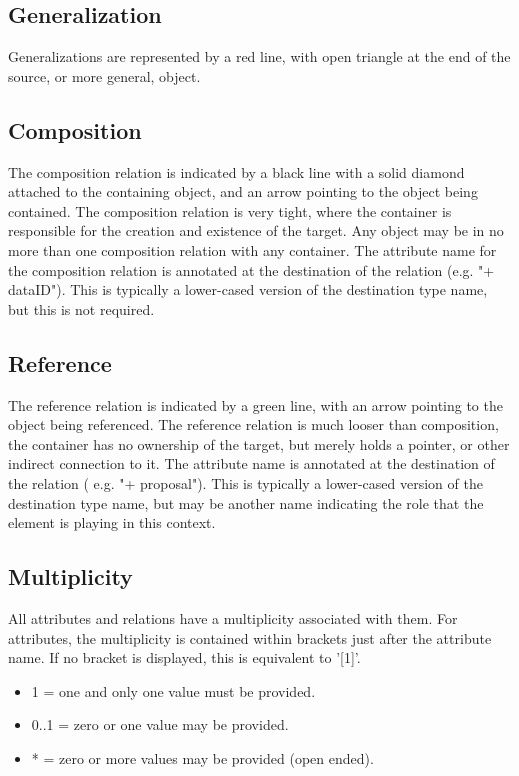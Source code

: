   \subsection{Generalization}
  \label{sect:Generalization}
  Generalizations are represented by a red line, with open triangle at the end of the source, or more general, object.

  \subsection{Composition}
  \label{sect:Composition}
  The composition relation is indicated by a black line with a solid diamond attached to the
containing object, and an arrow pointing to the object being contained. The composition relation is
very tight, where the container is responsible for the creation and existence of the target. Any
object may be in no more than one composition relation with any container. The attribute name
for the composition relation is annotated at the destination of the relation (e.g. "+ dataID"). This is
typically a lower-cased version of the destination type name, but this is not required.

  \subsection{Reference}
  \label{sect:Reference}
  The reference relation is indicated by a green line, with an arrow pointing to the object being
referenced. The reference relation is much looser than composition, the container has no
ownership of the target, but merely holds a pointer, or other indirect connection to it. The
attribute name is annotated at the destination of the relation ( e.g. "+ proposal"). This is typically
a lower-cased version of the destination type name, but may be another name indicating the role
that the element is playing in this context.

  \subsection{Multiplicity}
  \label{sect:Multiplicity}
  All attributes and relations have a multiplicity associated with them. For attributes, the multiplicity
is contained within brackets just after the attribute name. If no bracket is displayed, this is
equivalent to '[1]'.
\begin{itemize}
\item 1 = one and only one value must be provided.
\item 0..1 = zero or one value may be provided.
\item * = zero or more values may be provided (open ended).
\end{itemize}

